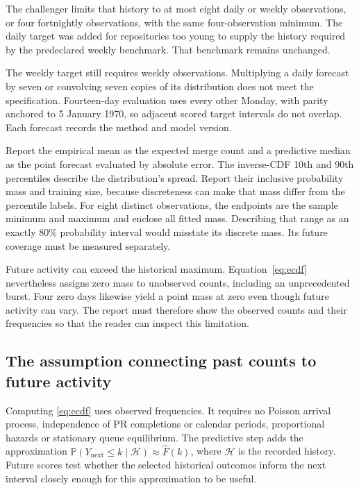 \documentclass[11pt,a4paper]{article}
\newcommand{\Prb}{\mathbb{P}}
\begin{document}
The challenger limits that history to at most eight daily or weekly observations, or four fortnightly observations, with the same four-observation minimum. The daily target was added for repositories too young to supply the history required by the predeclared weekly benchmark. That benchmark remains unchanged.

The weekly target still requires weekly observations. Multiplying a daily forecast by seven or convolving seven copies of its distribution does not meet the specification. Fourteen-day evaluation uses every other Monday, with parity anchored to 5 January 1970, so adjacent scored target intervals do not overlap. Each forecast records the method and model version.

Report the empirical mean as the expected merge count and a predictive median as the point forecast evaluated by absolute error. The inverse-CDF 10th and 90th percentiles describe the distribution's spread. Report their inclusive probability mass and training size, because discreteness can make that mass differ from the percentile labels. For eight distinct observations, the endpoints are the sample minimum and maximum and enclose all fitted mass. Describing that range as an exactly 80\% probability interval would misstate its discrete mass. Its future coverage must be measured separately.

Future activity can exceed the historical maximum. Equation~\eqref{eq:ecdf} nevertheless assigns zero mass to unobserved counts, including an unprecedented burst. Four zero days likewise yield a point mass at zero even though future activity can vary. The report must therefore show the observed counts and their frequencies so that the reader can inspect this limitation.

\subsection{The assumption connecting past counts to future activity}

Computing \eqref{eq:ecdf} uses observed frequencies. It requires no Poisson arrival process, independence of PR completions or calendar periods, proportional hazards or stationary queue equilibrium. The predictive step adds the approximation $\Prb(Y_{\mathrm{next}}\leq k\mid\mathcal H)\approx\widehat F(k)$, where $\mathcal H$ is the recorded history. Future scores test whether the selected historical outcomes inform the next interval closely enough for this approximation to be useful.
\end{document}
